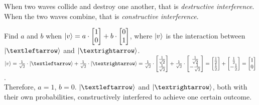 \newpage

\begin{definition}
    When two waves collide and destroy one another, that is \emph{destructive interference}. When the two waves combine, that is \emph{constructive interference}.
\end{definition}

\begin{example}
    Find $a$ and $b$ when $\lvert v\rangle = a \cdot \begin{bmatrix}
        1\\
        0
    \end{bmatrix} + b \cdot \begin{bmatrix}
        0\\
        1
    \end{bmatrix}$, where $\lvert v\rangle$ is the interaction between $\ket{←}$ and $\ket{→}$.\\
    $\ket{v} = \frac{1}{\sqrt{2}} \cdot \ket{←} + \frac{1}{\sqrt{2}} \cdot \ket{→} = \frac{1}{\sqrt{2}} \cdot \begin{bmatrix}\frac{1}{\sqrt{2}}\\\frac{1}{\sqrt{2}}\end{bmatrix} + \frac{1}{\sqrt{2}} \cdot \begin{bmatrix}\frac{1}{\sqrt{2}}\\-\frac{1}{\sqrt{2}}\end{bmatrix} = \begin{bmatrix}\frac{1}{2}\\\frac{1}{2}\end{bmatrix} + \begin{bmatrix}\frac{1}{2}\\-\frac{1}{2}\end{bmatrix} = \begin{bmatrix}1\\0\end{bmatrix}$.\\
    Therefore, $a = 1$, $b = 0$. $\ket{←}$ and $\ket{→}$, both with their own probabilities, constructively interfered to achieve one certain outcome.
\end{example}



